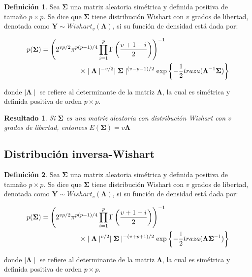 \documentclass[
  10pt,
  spanish,
]{book}
\newtheorem{proposition}{Resultado}[chapter]
\theoremstyle{definition}
\newtheorem{definition}{Definición}[chapter]
\theoremstyle{definition}
\theoremstyle{definition}
\theoremstyle{definition}
\theoremstyle{remark}
\begin{document}
\begin{definition}
\protect\hypertarget{def:unnamed-chunk-60}{}{\label{def:unnamed-chunk-60} }Sea \(\boldsymbol \Sigma\) una matriz aleatoria simétrica y definida positiva de tamaño \(p\times p\). Se dice que \(\boldsymbol \Sigma\) tiene distribución Wishart con \(v\) grados de libertad, denotada como \(\mathbf{Y}\sim Wishart_v(\boldsymbol \Lambda)\), si su función de densidad está dada por:

\begin{align}
p(\boldsymbol \Sigma)&=\left( 2^{vp/2}\pi^{p(p-1)/4}\prod_{i=1}^p \Gamma\left(\frac{v+1-i}{2}\right)    \right)^{-1} \notag \\
&\hspace{2cm}\times
 \mid \boldsymbol \Lambda\mid ^{-v/2} \mid \boldsymbol \Sigma\mid ^{(v-p-1)/2}
\exp\left\{ -\frac{1}{2}traza(\boldsymbol \Lambda^{-1}\boldsymbol \Sigma)\right\}
\end{align}

donde \(\mid \boldsymbol \Lambda\mid\) se refiere al determinante de la matriz \(\boldsymbol \Lambda\), la cual es simétrica y definida positiva de orden \(p\times p\).
\end{definition}

\begin{proposition}
\protect\hypertarget{prp:unnamed-chunk-61}{}{\label{prp:unnamed-chunk-61} }Si \(\boldsymbol \Sigma\) es una matriz aleatoria con distribución Wishart con \(v\) grados de libertad, entonces \(E(\boldsymbol \Sigma)=v\boldsymbol \Lambda\)
\end{proposition}

\hypertarget{distribuciuxf3n-inversa-wishart}{%
\subsection{Distribución inversa-Wishart}\label{distribuciuxf3n-inversa-wishart}}

\begin{definition}
\protect\hypertarget{def:unnamed-chunk-62}{}{\label{def:unnamed-chunk-62} }Sea \(\boldsymbol \Sigma\) una matriz aleatoria simétrica y definida positiva de tamaño \(p\times p\). Se dice que \(\boldsymbol \Sigma\) tiene distribución Wishart con \(v\) grados de libertad, denotada como \(\mathbf{Y}\sim Wishart_v(\boldsymbol \Lambda)\), si su función de densidad está dada por:

\begin{align}
p(\boldsymbol \Sigma)&=\left( 2^{vp/2}\pi^{p(p-1)/4}\prod_{i=1}^p \Gamma\left(\frac{v+1-i}{2}\right)    \right)^{-1} \notag \\
&\hspace{2cm}\times
 \mid \boldsymbol \Lambda\mid ^{v/2} \mid \boldsymbol \Sigma\mid ^{-(v+p+1)/2}
\exp\left\{ -\frac{1}{2}traza(\boldsymbol \Lambda\boldsymbol \Sigma^{-1})\right\}
\end{align}

donde \(\mid \boldsymbol \Lambda\mid\) se refiere al determinante de la matriz \(\boldsymbol \Lambda\), la cual es simétrica y definida positiva de orden \(p\times p\).
\end{definition}
\end{document}
